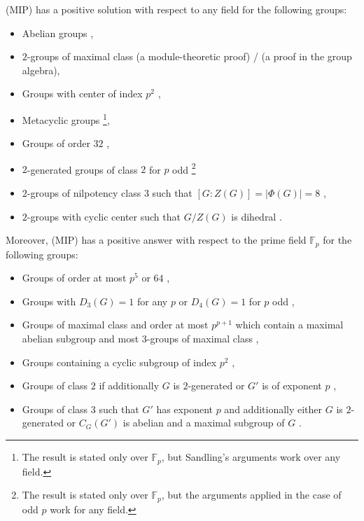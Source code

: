 \documentclass[11pt, a4paper]{amsart}
\theoremstyle{definition}
\begin{document}
(MIP) has a positive solution with respect to any field for the following groups:
\begin{itemize}
\item[(i)] Abelian groups \cite{Deskins56},
\item[(ii)] $2$-groups of maximal class \cite{Carlson77} (a module-theoretic proof) / \cite{Baginski92} (a proof in the group algebra),
\item[(iii)] Groups with center of index $p^2$ \cite{Drensky89},
\item[(iv)] Metacyclic groups \cite{BaginskiMetacyclic, SandlingMetacyclic}\footnote{The result is stated only over $\mathbb{F}_p$, but Sandling's arguments work over any field.},
\item[(v)] Groups of order $32$ \cite[Lemma 3.7]{NavarroSambale},
\item[(vi)] $2$-generated groups of class $2$ for $p$ odd \cite{BrochedelRio21}\footnote{The result is stated only over $\mathbb{F}_p$, but the arguments applied in the case of odd $p$ work for any field.}
\item[(vii)] $2$-groups of nilpotency class $3$ such that $[G:Z(G)] = |\Phi(G)| = 8$ \cite{MargolisSakuraiStanojkovski21},
\item[(viii)] $2$-groups with cyclic center such that $G/Z(G)$ is dihedral \cite{MargolisSakuraiStanojkovski21}.
\end{itemize}

Moreover, (MIP) has a positive answer with respect to the prime field $\mathbb{F}_p$ for the following groups:
\begin{itemize}
\item[(ix)] Groups of order at most $p^5$ \cite{Passmanp4, SalimSandlingp5} or $64$ \cite{HertweckSoriano06},
\item[(x)] Groups with $D_3(G) = 1$ \cite{PassiSehgal72} for any $p$ or $D_4(G) = 1$ for $p$ odd \cite{Hertweck07},
\item[(xi)] Groups of maximal class and order at most $p^{p+1}$ which contain a maximal abelian subgroup \cite{BaginskiCaranti88} and most $3$-groups of maximal class \cite{BaginskiKurdics},
\item[(xii)] Groups containing a cyclic subgroup of index $p^2$ \cite{BaginskiKonovalov07},
\item[(xiii)] Groups of class $2$ if additionally $G$ is $2$-generated \cite{BrochedelRio21} or $G'$ is of exponent $p$ \cite{Sandling89},
\item[(xiv)] Groups of class $3$ such that $G'$ has exponent $p$ and additionally either $G$ is $2$-generated \cite{MargolisMoede} or $C_G(G')$ is abelian and a maximal subgroup of $G$ \cite{MargolisStanojkovski21}.
\end{itemize}
\end{document}
